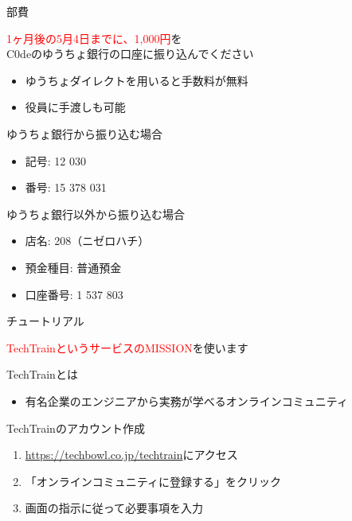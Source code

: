 \documentclass[12pt, unicode]{beamer}
\begin{document}
\begin{frame}{部費}
    \begin{center}
        {\large \textcolor{red}{1ヶ月後の5月4日までに、1,000円}を\\C0deのゆうちょ銀行の口座に振り込んでください}
        \begin{itemize}
            \item ゆうちょダイレクトを用いると手数料が無料
            \item 役員に手渡しも可能
        \end{itemize}
    \end{center}

    \begin{block}{ゆうちょ銀行から振り込む場合}
        \begin{itemize}
            \item 記号: 12 030
            \item 番号: 15 378 031
        \end{itemize}
    \end{block}

    \begin{block}{ゆうちょ銀行以外から振り込む場合}
        \begin{itemize}
            \item 店名: 208（ニゼロハチ）
            \item 預金種目: 普通預金
            \item 口座番号: 1 537 803
        \end{itemize}
    \end{block}
\end{frame}

\begin{frame}{チュートリアル}
    \begin{center}
        {\large \textcolor{red}{TechTrainというサービスのMISSION}を使います}
    \end{center}

    \begin{block}{TechTrainとは}
        \begin{itemize}
            \item 有名企業のエンジニアから実務が学べるオンラインコミュニティ
        \end{itemize}
    \end{block}

    \begin{block}{TechTrainのアカウント作成}
        \begin{enumerate}
            \item \textcolor{blue}{\url{https://techbowl.co.jp/techtrain}}にアクセス
            \item 「オンラインコミュニティに登録する」をクリック
            \item 画面の指示に従って必要事項を入力
        \end{enumerate}
    \end{block}
\end{frame}
\end{document}
